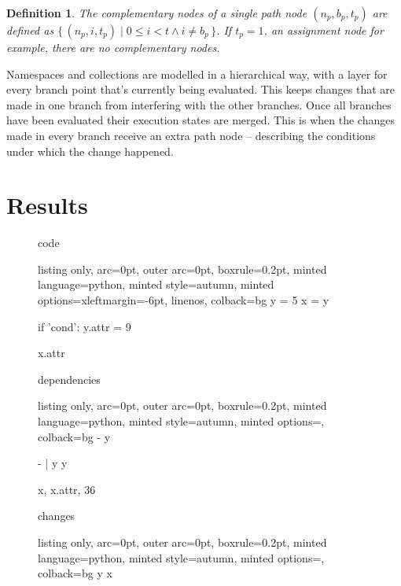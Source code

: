 \documentclass[a4paper, 11pt]{article}
\newtheorem{definition}{Definition}
\begin{document}
\begin{multicols*}{2}
\begin{definition} \label{def:complement}
The complementary nodes of a single path node $(n_p, b_p, t_p)$ are defined as $\{\, (n_p, i, t_p) \mid 0 \leq i < t \wedge i \neq b_p \,\}$. If $t_p = 1$, an assignment node for example, there are no complementary nodes.
\end{definition}

Namespaces and collections are modelled in a hierarchical way, with a layer for every branch point that's currently being evaluated. This keeps changes that are made in one branch from interfering with the other branches. Once all branches have been evaluated their execution states are merged. This is when the changes made in every branch receive an extra path node -- describing the conditions under which the change happened. 

\section{Results}

\begin{figure*}[t]
 \begin{minipage}{0.32\textwidth}
 code
 \vspace{2pt}
  \begin{tcblisting}{listing only, 
    arc=0pt,
    outer arc=0pt, 
    boxrule=0.2pt,
    minted language=python,
    minted style=autumn,
    minted options={xleftmargin=-6pt, linenos},
    colback=bg }
y = 5
x = y

if 'cond':
  y.attr = 9

x.attr
\end{tcblisting}
 \end{minipage}
 \begin{minipage}{0.32\textwidth}
 dependencies
  \begin{tcblisting}{listing only, 
    arc=0pt,
    outer arc=0pt, 
    boxrule=0.2pt,
    minted language=python,
    minted style=autumn,
    minted options={},
    colback=bg }
-
y

- | y
    y

x, x.attr, 36
\end{tcblisting}
 \end{minipage}
 \begin{minipage}{0.32\textwidth}
 changes
  \begin{tcblisting}{listing only, 
    arc=0pt,
    outer arc=0pt, 
    boxrule=0.2pt,
    minted language=python,
    minted style=autumn,
    minted options={},
    colback=bg }
y
x


\end{tcblisting}
\end{minipage}
\end{figure*}
\end{multicols*}
\end{document}
